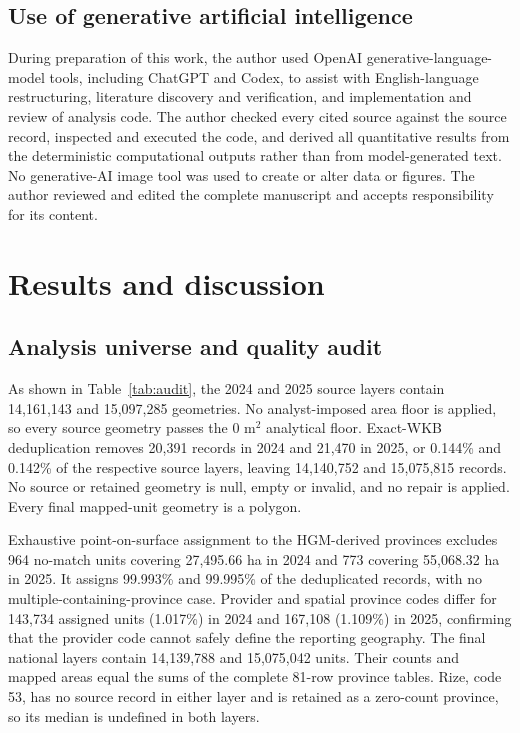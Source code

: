 \documentclass[pdflatex,sn-basic]{sn-jnl}
\begin{document}
\subsection{Use of generative artificial intelligence}\label{subsec:generative-ai}

During preparation of this work, the author used OpenAI generative-language-model tools, including ChatGPT and Codex, to assist with English-language restructuring, literature discovery and verification, and implementation and review of analysis code. The author checked every cited source against the source record, inspected and executed the code, and derived all quantitative results from the deterministic computational outputs rather than from model-generated text. No generative-AI image tool was used to create or alter data or figures. The author reviewed and edited the complete manuscript and accepts responsibility for its content.

\section{Results and discussion}\label{sec:results}

\subsection{Analysis universe and quality audit}\label{subsec:audit}

As shown in Table~\ref{tab:audit}, the 2024 and 2025 source layers contain 14,161,143 and 15,097,285 geometries. No analyst-imposed area floor is applied, so every source geometry passes the 0 m$^{2}$ analytical floor. Exact-WKB deduplication removes 20,391 records in 2024 and 21,470 in 2025, or 0.144\% and 0.142\% of the respective source layers, leaving 14,140,752 and 15,075,815 records. No source or retained geometry is null, empty or invalid, and no repair is applied. Every final mapped-unit geometry is a polygon.

Exhaustive point-on-surface assignment to the HGM-derived provinces excludes 964 no-match units covering 27,495.66 ha in 2024 and 773 covering 55,068.32 ha in 2025. It assigns 99.993\% and 99.995\% of the deduplicated records, with no multiple-containing-province case. Provider and spatial province codes differ for 143,734 assigned units (1.017\%) in 2024 and 167,108 (1.109\%) in 2025, confirming that the provider code cannot safely define the reporting geography. The final national layers contain 14,139,788 and 15,075,042 units. Their counts and mapped areas equal the sums of the complete 81-row province tables. Rize, code 53, has no source record in either layer and is retained as a zero-count province, so its median is undefined in both layers.
\end{document}
